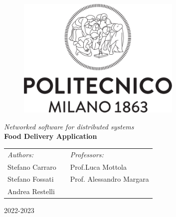 \begin{titlepage}
\begin{center}
		\begin{figure}[ht]
			\centering\includegraphics[width=0.7\textwidth]{resources/Logo_Politecnico_Milano.png}
		\end{figure}
        
        \vspace{3.5cm}

        \LARGE
        \textit{Networked software for distributed systems}\\

        \vspace{0.5cm}
        \Large
        \textbf{Food Delivery Application}
        
        \vspace{\fill}
  
		\large
		\begin{tabularx}{\linewidth}{@{}lXl@{}}
			\textit{Authors:}  & & \textit{Professors:} \\
			Stefano Carraro      & & Prof.\@ Luca Mottola\\
			Stefano Fossati  & & Prof. Alessandro Margara \\
			Andrea Restelli & & \\
		\end{tabularx}		
		\thispagestyle{empty}

        \vspace{1cm}

        2022-2023
           
\end{center}
\end{titlepage}